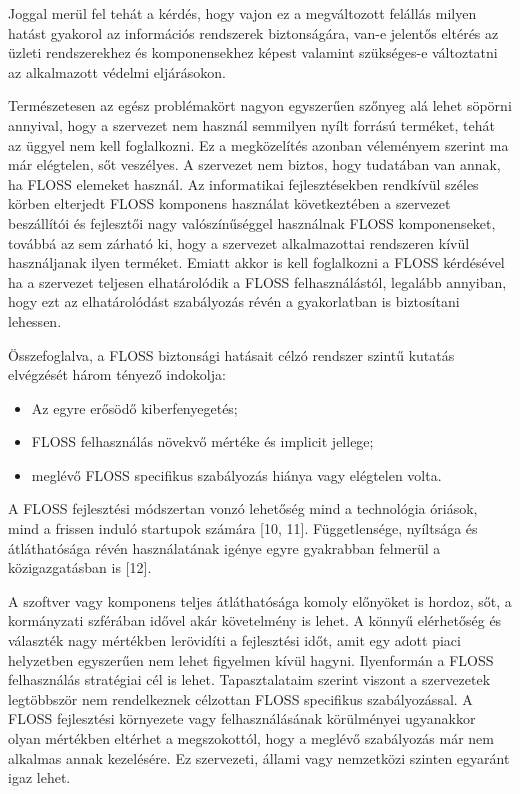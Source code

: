 \documentclass[12pt,magyar,a4paper,oneside]{scrreprt}
\providecommand{\tightlist}{%
  \setlength{\itemsep}{0pt}\setlength{\parskip}{0pt}}
\begin{document}
Joggal merül fel tehát a kérdés, hogy vajon ez a megváltozott felállás
milyen hatást gyakorol az információs rendszerek biztonságára, van-e
jelentős eltérés az üzleti rendszerekhez és komponensekhez képest
valamint szükséges-e változtatni az alkalmazott védelmi eljárásokon.

Természetesen az egész problémakört nagyon egyszerűen szőnyeg alá lehet
söpörni annyival, hogy a szervezet nem használ semmilyen nyílt forrású
terméket, tehát az üggyel nem kell foglalkozni. Ez a megközelítés
azonban véleményem szerint ma már elégtelen, sőt veszélyes. A szervezet
nem biztos, hogy tudatában van annak, ha FLOSS elemeket használ. Az
informatikai fejlesztésekben rendkívül széles körben elterjedt FLOSS
komponens használat következtében a szervezet beszállítói és fejlesztői
nagy valószínűséggel használnak FLOSS komponenseket, továbbá az sem
zárható ki, hogy a szervezet alkalmazottai rendszeren kívül használjanak
ilyen terméket. Emiatt akkor is kell foglalkozni a FLOSS kérdésével ha a
szervezet teljesen elhatárolódik a FLOSS felhasználástól, legalább
annyiban, hogy ezt az elhatárolódást szabályozás révén a gyakorlatban is
biztosítani lehessen.

Összefoglalva, a FLOSS biztonsági hatásait célzó rendszer szintű kutatás
elvégzését három tényező indokolja:

\begin{itemize}
\tightlist
\item
  Az egyre erősödő kiberfenyegetés;
\item
  FLOSS felhasználás növekvő mértéke és implicit jellege;
\item
  meglévő FLOSS specifikus szabályozás hiánya vagy elégtelen volta.
\end{itemize}

A FLOSS fejlesztési módszertan vonzó lehetőség mind a technológia
óriások, mind a frissen induló startupok számára {[}10, 11{]}.
Függetlensége, nyíltsága és átláthatósága révén használatának igénye
egyre gyakrabban felmerül a közigazgatásban is {[}12{]}.

A szoftver vagy komponens teljes átláthatósága komoly előnyöket is
hordoz, sőt, a kormányzati szférában idővel akár követelmény is lehet. A
könnyű elérhetőség és választék nagy mértékben lerövidíti a fejlesztési
időt, amit egy adott piaci helyzetben egyszerűen nem lehet figyelmen
kívül hagyni. Ilyenformán a FLOSS felhasználás stratégiai cél is lehet.
Tapasztalataim szerint viszont a szervezetek legtöbbször nem
rendelkeznek célzottan FLOSS specifikus szabályozással. A FLOSS
fejlesztési környezete vagy felhasználásának körülményei ugyanakkor
olyan mértékben eltérhet a megszokottól, hogy a meglévő szabályozás már
nem alkalmas annak kezelésére. Ez szervezeti, állami vagy nemzetközi
szinten egyaránt igaz lehet.
\end{document}
